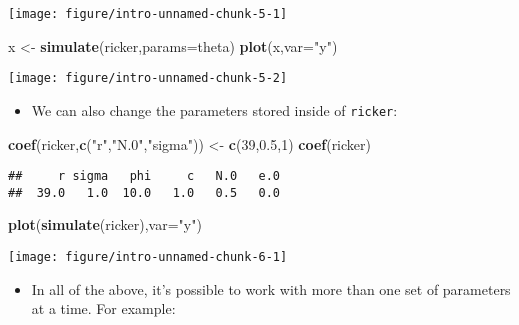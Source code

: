 \documentclass[]{article}
\newenvironment{Shaded}{\begin{snugshade}}{\end{snugshade}}
\newcommand{\KeywordTok}[1]{\textcolor[rgb]{0.13,0.29,0.53}{\textbf{#1}}}
\newcommand{\DataTypeTok}[1]{\textcolor[rgb]{0.13,0.29,0.53}{#1}}
\newcommand{\DecValTok}[1]{\textcolor[rgb]{0.00,0.00,0.81}{#1}}
\newcommand{\FloatTok}[1]{\textcolor[rgb]{0.00,0.00,0.81}{#1}}
\newcommand{\StringTok}[1]{\textcolor[rgb]{0.31,0.60,0.02}{#1}}
\newcommand{\NormalTok}[1]{#1}
\providecommand{\tightlist}{%
  \setlength{\itemsep}{0pt}\setlength{\parskip}{0pt}}
\begin{document}
\begin{center}\texttt{[image: figure/intro-unnamed-chunk-5-1]} \end{center}

\begin{Shaded}
\begin{Highlighting}[]
\NormalTok{x <-}\StringTok{ }\KeywordTok{simulate}\NormalTok{(ricker,}\DataTypeTok{params=}\NormalTok{theta)}
\KeywordTok{plot}\NormalTok{(x,}\DataTypeTok{var=}\StringTok{"y"}\NormalTok{)}
\end{Highlighting}
\end{Shaded}

\begin{center}\texttt{[image: figure/intro-unnamed-chunk-5-2]} \end{center}

\begin{itemize}
\tightlist
\item
  We can also change the parameters stored inside of \texttt{ricker}:
\end{itemize}

\begin{Shaded}
\begin{Highlighting}[]
\KeywordTok{coef}\NormalTok{(ricker,}\KeywordTok{c}\NormalTok{(}\StringTok{"r"}\NormalTok{,}\StringTok{"N.0"}\NormalTok{,}\StringTok{"sigma"}\NormalTok{)) <-}\StringTok{ }\KeywordTok{c}\NormalTok{(}\DecValTok{39}\NormalTok{,}\FloatTok{0.5}\NormalTok{,}\DecValTok{1}\NormalTok{)}
\KeywordTok{coef}\NormalTok{(ricker)}
\end{Highlighting}
\end{Shaded}

\begin{verbatim}
##     r sigma   phi     c   N.0   e.0 
##  39.0   1.0  10.0   1.0   0.5   0.0
\end{verbatim}

\begin{Shaded}
\begin{Highlighting}[]
\KeywordTok{plot}\NormalTok{(}\KeywordTok{simulate}\NormalTok{(ricker),}\DataTypeTok{var=}\StringTok{"y"}\NormalTok{)}
\end{Highlighting}
\end{Shaded}

\begin{center}\texttt{[image: figure/intro-unnamed-chunk-6-1]} \end{center}

\begin{itemize}
\tightlist
\item
  In all of the above, it's possible to work with more than one set of
  parameters at a time. For example:
\end{itemize}
\end{document}
